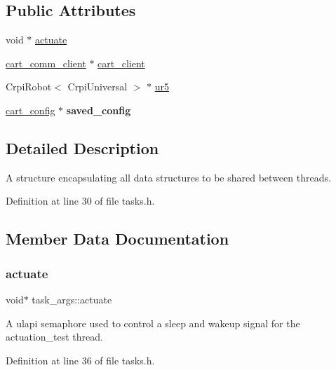 \subsection*{Public Attributes}
\begin{DoxyCompactItemize}
\item 
void $\ast$ \mbox{\hyperlink{structtask__args_ac7e725b0ffef940a29047c83bde81aa6}{actuate}}
\item 
\mbox{\hyperlink{classcart__comm__client}{cart\+\_\+comm\+\_\+client}} $\ast$ \mbox{\hyperlink{structtask__args_a94ff8387005d356c9677adfea4301967}{cart\+\_\+client}}
\item 
Crpi\+Robot$<$ Crpi\+Universal $>$ $\ast$ \mbox{\hyperlink{structtask__args_a8097f89f57e14fb26dd96ccc8bb29fea}{ur5}}
\item 
\mbox{\label{structtask__args_a1484fa373dc33c045bf450933d675ba6}} 
\mbox{\hyperlink{classcart__config}{cart\+\_\+config}} $\ast$ {\bfseries saved\+\_\+config}
\end{DoxyCompactItemize}


\subsection{Detailed Description}
A structure encapsulating all data structures to be shared between threads. 

Definition at line 30 of file tasks.\+h.



\subsection{Member Data Documentation}
\mbox{\label{structtask__args_ac7e725b0ffef940a29047c83bde81aa6}} 
\subsubsection{\texorpdfstring{actuate}{actuate}}
{\footnotesize\ttfamily void$\ast$ task\+\_\+args\+::actuate}

A ulapi semaphore used to control a sleep and wakeup signal for the actuation\+\_\+test thread. 

Definition at line 36 of file tasks.\+h.

\mbox{\label{structtask__args_a94ff8387005d356c9677adfea4301967}} 
